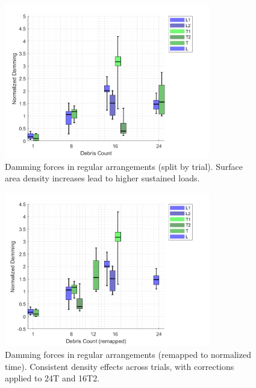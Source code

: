 \documentclass{article}
\begin{document}
\begin{figure}[htbp]
    \centering
    \includegraphics[width=0.8\textwidth]{Damming_Regular_L_T_SplitByTrial.png}
    \caption{Damming forces in regular arrangements (split by trial). Surface area density increases lead to higher sustained loads.}
    \label{fig:damming_regular_split}
\end{figure}

\begin{figure}[htbp]
    \centering
    \includegraphics[width=0.8\textwidth]{Damming_Regular_L_T_SplitByTrial_Remapped.png}
    \caption{Damming forces in regular arrangements (remapped to normalized time). Consistent density effects across trials, with corrections applied to 24T and 16T2.}
    \label{fig:damming_regular_remap}
\end{figure}
\end{document}
